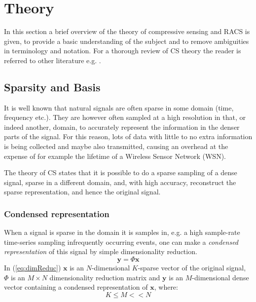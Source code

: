 \documentclass[Main]{subfiles}
\begin{document}
\section{Theory} %
\label{sec:theory}

	In this section a brief overview of the theory of compressive sensing and RACS is given, to provide a basic understanding of the subject and to remove ambiguities in terminology and notation.
	For a thorough review of CS theory the reader is referred to other literature e.g. \cite{Fazel2011,Candes2008}.

	\subsection{Sparsity and Basis} %
	\label{sub:sparsity_and_basis}

		It is well known that natural signals are often sparse in some domain (time, frequency etc.)\cite{Candes2008}.
		They are however often sampled at a high resolution in that, or indeed another, domain, to accurately represent the information in the denser parts of the signal.
		For this reason, lots of data with little to no extra information is being collected and maybe also transmitted, causing an overhead at the expense of for example the lifetime of a Wireless Sensor Network (WSN).

		The theory of CS states that it is possible to do a sparse sampling of a dense signal, sparse in a different domain, and, with high accuracy, reconstruct the sparse representation, and hence the original signal.

		\subsubsection{Condensed representation} %
		\label{sub:condensed_representation}

			When a signal is sparse in the domain it is samples in, e.g. a high sample-rate time-series sampling infrequently occurring events, one can make a \emph{condensed representation} of this signal by simple dimensionality reduction.
			\begin{equation}
				\mathbf{y} = \Phi \mathbf{x}
				\label{eq:dimReduc}
			\end{equation}
			In (\ref{eq:dimReduc}) $\mathbf{x}$ is an $N$-dimensional $K$-sparse vector of the original signal, $\Phi$ is an $ M \times N $ dimensionality reduction matrix and $\mathbf{y}$ is an $M$-dimensional dense vector containing a condensed representation of $\mathbf{x} $, where:
			\begin{equation}
				K \leq M << N 	
			\end{equation}
\end{document}
